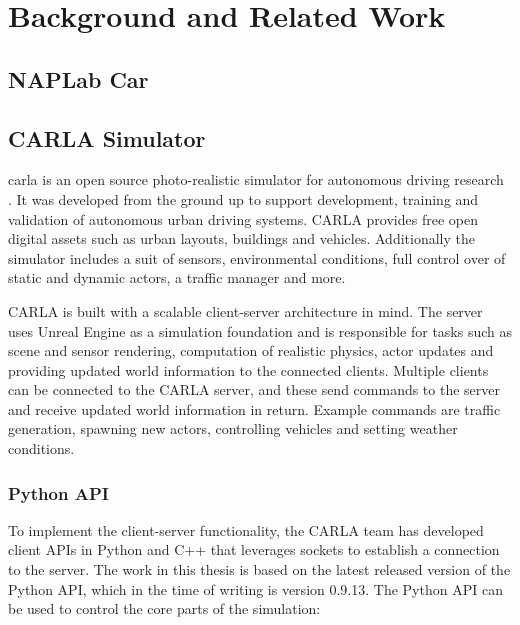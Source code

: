 \chapter{Background and Related Work}
\label{chap:background}

\section{NAPLab Car}


\section{CARLA Simulator}
\acrfull{carla} is an open source photo-realistic simulator for autonomous driving research \cite{introducing-carla-paper}. It was developed from the ground up to support development, training and validation of autonomous urban driving systems. CARLA provides free open digital assets such as urban layouts, buildings and vehicles. Additionally the simulator includes a suit of sensors, environmental conditions, full control over of static and dynamic actors, a traffic manager and more.

CARLA is built with a scalable client-server architecture in mind. The server uses Unreal Engine \cite{unrealengine} as a simulation foundation and is responsible for tasks such as scene and sensor rendering, computation of realistic physics, actor updates and providing updated world information to the connected clients. Multiple clients can be connected to the CARLA server, and these send commands to the server and receive updated world information in return. Example commands are traffic generation, spawning new actors, controlling vehicles and setting weather conditions.

\subsection{Python API}
To implement the client-server functionality, the CARLA team has developed client APIs in Python \cite{carla-python-api} and C++ \cite{carla-cplusplus-api} that leverages sockets to establish a connection to the server. The work in this thesis is based on the latest released version of the Python API, which in the time of writing is version 0.9.13. The Python API can be used to control the core parts of the simulation: 


